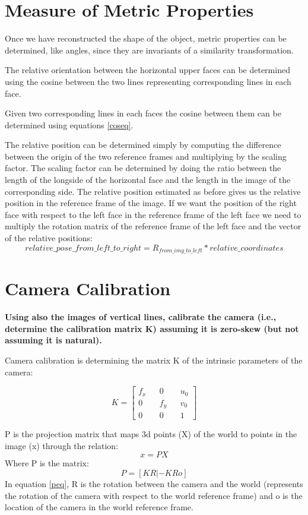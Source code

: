 \documentclass[11pt, oneside]{article}   	%
\begin{document}
\section {Measure of Metric Properties} \label{metricprop}
Once we have reconstructed the shape of the object, metric properties can be determined, like angles, since they are invariants of a similarity transformation.

The relative orientation between the horizontal upper faces can be determined using the cosine between the two lines representing corresponding lines in each face.

Given two corresponding lines in each faces the cosine between them can be determined using equations \ref{coseq}.

The relative position can be determined simply by computing the difference between the origin of the two reference frames and multiplying by the scaling factor.
The scaling factor can be determined by doing the ratio between the length of the longside of the horizontal face and the length in the image of the corresponding side.
The relative position estimated as before gives us the relative position in the reference frame of the image. If we want the position of the right face with respect to the left face in the reference frame of the left face we need to multiply the rotation matrix of the reference frame of the left face and the vector of the relative positions:
$$
relative\_pose\_from\_left\_to\_right = R_{from\_img\_to\_left} * relative\_coordinates
$$
\section{Camera Calibration} 
\textbf{Using also the images of vertical lines, calibrate the camera (i.e., determine the calibration matrix K) assuming it is zero-skew (but not assuming it is natural).} \hfill \break

Camera calibration is determining the matrix K of the intrinsic parameters of the camera:

\begin{equation} \label{keq}
K =
\begin{bmatrix}
f_x  && 0 && u_0 \\ 0 && f_y && v_0 \\ 0 && 0 && 1
\end{bmatrix}
\end{equation}

P is the projection matrix that maps 3d points (X) of the world to points in the image (x) through the relation:
\begin{equation} \label{peq1}
x = P X
\end{equation}
Where P is the matrix:
\begin{equation} \label{peq}
P=[KR | -KRo]
\end{equation}
In equation \ref{peq}, R is the rotation between the camera and the world (represents the rotation of the camera with respect to the world reference frame) and o is the location of the camera in the world reference frame.
\end{document}
